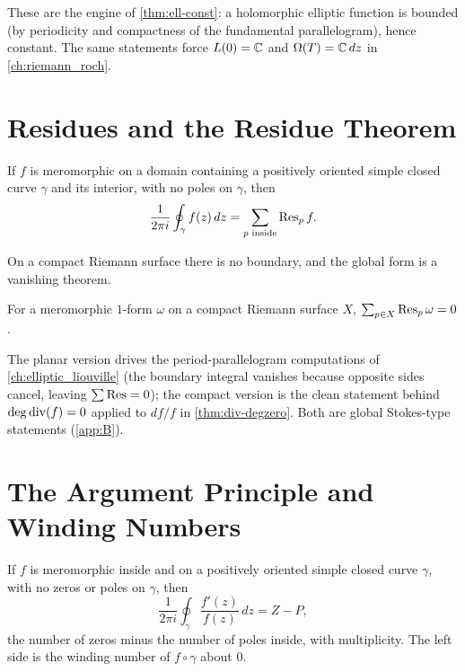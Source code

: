 These are the engine of \cref{thm:ell-const}: a holomorphic elliptic function is
bounded (by periodicity and compactness of the fundamental parallelogram), hence
constant. The same statements force \(L(0) = \mathbb{C}\) and \(\Omega(T) = \mathbb{C}\,dz\) in
\cref{ch:riemann_roch}.

\section{Residues and the Residue Theorem}
\label{sec:A-residues}

\begin{theorem}
\label{thm:A-residue-plane}
If \(f\) is meromorphic on a domain containing a positively oriented simple closed
curve \(\gamma\) and its interior, with no poles on \(\gamma\), then
\[
  \frac{1}{2\pi i} \oint_\gamma f(z)\,dz = \sum_{p \text{ inside}} \operatorname{Res}_p f .
\]
\end{theorem}

On a compact Riemann surface there is no boundary, and the global form is a
vanishing theorem.

\begin{theorem}
\label{thm:A-residue-compact}
For a meromorphic \(1\)-form \(\omega\) on a compact Riemann surface \(X\),
\(\sum_{p \in X} \operatorname{Res}_p \omega = 0\).
\end{theorem}

The planar version drives the period-parallelogram computations of
\cref{ch:elliptic_liouville} (the boundary integral vanishes because opposite
sides cancel, leaving \(\sum \operatorname{Res} = 0\)); the compact version is the clean
statement behind \(\deg\operatorname{div}(f) = 0\) applied to \(df/f\) in
\cref{thm:div-degzero}. Both are global Stokes-type statements
(\cref{app:B}).

\section{The Argument Principle and Winding Numbers}
\label{sec:A-argument}

\begin{theorem}
\label{thm:A-argument}
If \(f\) is meromorphic inside and on a positively oriented simple closed curve
\(\gamma\), with no zeros or poles on \(\gamma\), then
\[
  \frac{1}{2\pi i} \oint_\gamma \frac{f'(z)}{f(z)}\,dz = Z - P,
\]
the number of zeros minus the number of poles inside, with multiplicity. The
left side is the winding number of \(f \circ \gamma\) about \(0\).
\end{theorem}

